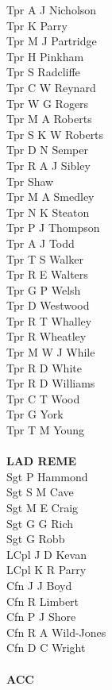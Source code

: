 \begin{multicols}{2}
  Tpr A J Nicholson \\
  Tpr K Parry \\
  Tpr M J Partridge \\
  Tpr H Pinkham \\
  Tpr S Radcliffe \\
  Tpr C W Reynard \\
  Tpr W G Rogers \\
  Tpr M A Roberts \\
  Tpr S K W Roberts \\
  Tpr D N Semper \\
  Tpr R A J Sibley \\
  Tpr Shaw \\
  Tpr M A Smedley \\
  Tpr N K Steaton \\
  Tpr P J Thompson \\
  Tpr A J Todd \\
  Tpr T S Walker \\
  Tpr R E Walters \\
  Tpr G P Welsh \\
  Tpr D Westwood \\
  Tpr R T Whalley \\
  Tpr R Wheatley \\
  Tpr M W J While \\
  Tpr R D White \\
  Tpr R D Williams \\
  Tpr C T Wood \\
  Tpr G York \\
  Tpr T M Young \\
  \\
  \textbf{LAD REME} \\
  Sgt P Hammond \\
  Sgt S M Cave \\
  Sgt M E Craig \\
  Sgt G G Rich \\
  Sgt G Robb \\
  LCpl J D Kevan \\
  LCpl K R Parry \\
  Cfn J J Boyd \\
  Cfn R Limbert \\
  Cfn P J Shore \\
  Cfn R A Wild-Jones \\
  Cfn D C Wright \\
  \\
  \textbf{ACC} \\

\end{multicols}
